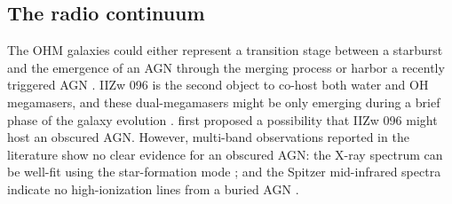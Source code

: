 \documentclass[]{aa} %
\begin{document}


\subsection{The radio continuum}
 The OHM galaxies could either represent a transition stage between a starburst and the emergence of an AGN through the merging process \citep{2020A&A...638A..78P} or harbor a recently triggered AGN \citep{2020MNRAS.498.2632H}. IIZw 096 is the second object to co-host both water and OH megamasers, and these dual-megamasers might be only emerging during a brief phase of the galaxy evolution \citep[e.g., from starburst nucleus to an AGN, see][]{2016ApJ...816...55W}. \cite{2011MNRAS.416.1267M} first proposed a possibility that IIZw 096 might host an obscured AGN. However, multi-band observations reported in the literature show no clear
 evidence for an obscured AGN: the X-ray spectrum can be well-fit using the star-formation mode \citep{2021MNRAS.506.5935R,2011A&A...529A.106I}; and the Spitzer mid-infrared spectra indicate no high-ionization lines from a buried AGN \citep{2010AJ....140...63I}.

\end{document}
